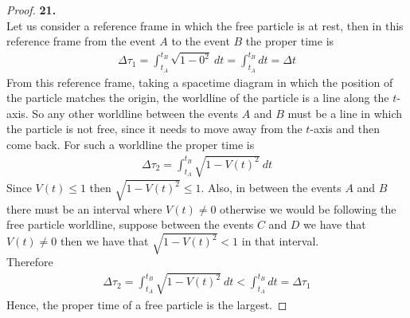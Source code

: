 \documentclass[11pt]{article}
\theoremstyle{definition}
\begin{document}
\cleardoublepage
\begin{proof}{\textbf{21.}}\\
Let us consider a reference frame in which the free particle is at rest, then
in this reference frame from the event $A$ to the event $B$ the proper time
is
\begin{align*}
    \Delta\tau_1 = \int_{t_A}^{t_B} \sqrt{1 - 0^2}~dt
    = \int_{t_A}^{t_B} dt = \Delta t
\end{align*}
From this reference frame, taking a spacetime diagram in which the position of
the particle matches the origin, the worldline of the particle is
a line along the $t$-axis. So any other worldline between the events $A$ and
$B$ must be a line in which the particle is not free, since it needs to move
away from the $t$-axis and then come back. For such a worldline the proper time
is
\begin{align*}
    \Delta\tau_{2} = \int_{t_A}^{t_B} \sqrt{1 - V(t)^2}~dt
\end{align*}
Since $V(t) \leq 1$ then $ \sqrt{1 - V(t)^2} \leq 1$. Also, in between the 
events $A$ and $B$ there must be an interval where $V(t) \neq 0$ otherwise
we would be following the free particle worldline, suppose between the events
$C$ and $D$ we have that $V(t) \neq 0$ then we have that
$\sqrt{1 - V(t)^2} < 1$ in that interval. \\
Therefore
\begin{align*}
    \Delta\tau_2 = \int_{t_A}^{t_B} \sqrt{1 - V(t)^2}~dt
    < \int_{t_A}^{t_B} dt = \Delta\tau_1
\end{align*}
Hence, the proper time of a free particle is the largest.
\end{proof}
\end{document}

